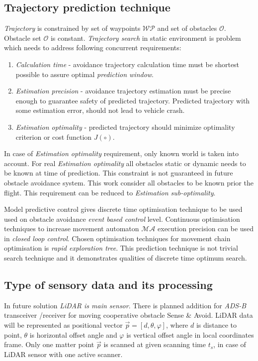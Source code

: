 \subsection*{Trajectory prediction technique}
\noindent \textit{Trajectory} is constrained by set of waypoints $\mathscr{WP}$ and set of obstacles $\mathscr{O}$. Obstacle set $\mathscr{O}$ is constant. \textit{Trajectory search} in static environment is problem which needs to address following concurrent requirements:
\begin{enumerate}
    \item \textit{Calculation time} - avoidance trajectory calculation time must be shortest possible to assure optimal \textit{prediction window}.
    \item \textit{Estimation precision} - avoidance trajectory estimation must be precise enough to guarantee safety of predicted trajectory. Predicted trajectory with some estimation error, should not lead to vehicle crash. 
    \item \textit{Estimation optimality} - predicted trajectory should minimize optimality criterion or cost function $J(\circ)$.
\end{enumerate}
\noindent In case of \textit{Estimation optimality} requirement, only known world is taken into account. For real \textit{Estimation optimality} all obstacles static or dynamic needs to be known at time of prediction. This constraint is not guaranteed in future obstacle avoidance system. This work consider all obstacles to be known prior the flight. This requirement can be reduced to \textit{Estimation sub-optimality}.

Model predictive control gives discrete time optimisation technique to be used used on obstacle avoidance \textit{event based control} level.  Continuous optimisation techniques to increase movement automaton $\mathscr{MA}$ execution precision can be used in \textit{closed loop control}. Chosen optimisation techniques for movement chain optimisation is \textit{rapid exploration tree}. This prediction technique is not trivial search technique and it demonstrates qualities of discrete time optimum search.

\subsection*{Type of sensory data and its processing}
\noindent In future solution \textit{LiDAR is main sensor}. There is planned addition for \textit{ADS-B} transceiver /receiver for moving cooperative obstacle Sense \& Avoid. LiDAR data will be represented as positional vector $\vec{p}=[d,\theta,\varphi]$, where $d$ is distance to point, $\theta$ is horizontal offset angle and $\varphi$ is vertical offset angle in local coordinates frame. Only one matter point $\vec{p}$ is scanned at given scanning time $t_s$, in case of LiDAR sensor with one active scanner. 

